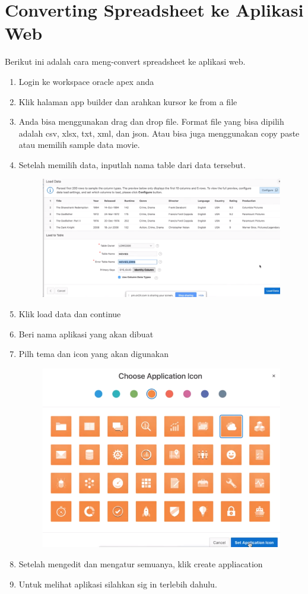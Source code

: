 \section{Converting Spreadsheet ke Aplikasi Web}
Berikut ini adalah cara meng-convert spreadsheet ke aplikasi web.
\begin{enumerate}
    \item Login ke workspace oracle apex anda
    \item Klik halaman app builder dan arahkan kursor ke from a file
    \item Anda bisa menggunakan drag dan drop file. Format file yang bisa dipilih adalah csv, xlsx, txt, xml, dan json. Atau bisa juga menggunakan copy paste atau memilih sample data movie.
    \item Setelah memilih data, inputlah nama table dari data tersebut.
    
\begin{figure}[!htbp]
    \centering
    \includegraphics[scale=0.5]{section/gambar_bab1/nama_tabel.png}
    \label{penanda}
\end{figure}
    \item Klik load data dan continue
    \item Beri nama aplikasi yang akan dibuat
    \item Pilh tema dan icon yang akan digunakan
    
\begin{figure}[!htbp]
    \centering
    \includegraphics[scale=0.5]{section/gambar_bab1/icon.png}
    \label{penanda}
\end{figure}
    \item {Setelah mengedit dan mengatur semuanya, klik create appliacation}
    \item Untuk melihat aplikasi silahkan sig in terlebih dahulu.
\end{enumerate}


